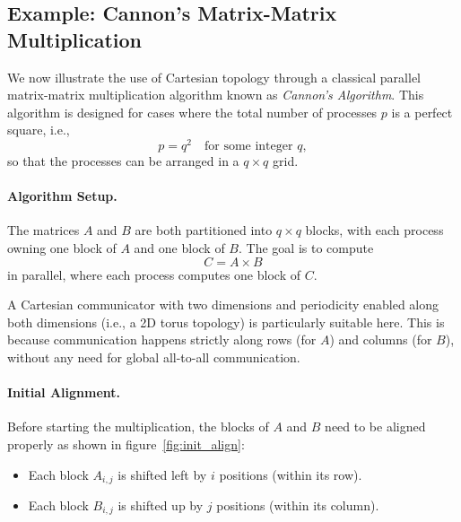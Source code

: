 \documentclass[12pt]{book}
\begin{document}
\subsection{Example: Cannon's Matrix-Matrix Multiplication}

We now illustrate the use of Cartesian topology through a classical parallel matrix-matrix multiplication algorithm known as \emph{Cannon's Algorithm}. This algorithm is designed for cases where the total number of processes $p$ is a perfect square, i.e.,
\[
p = q^2 \quad \text{for some integer } q,
\]
so that the processes can be arranged in a $q \times q$ grid.  

\paragraph{Algorithm Setup.}  
The matrices $A$ and $B$ are both partitioned into $q \times q$ blocks, with each process owning one block of $A$ and one block of $B$. The goal is to compute
\[
C = A \times B
\]
in parallel, where each process computes one block of $C$.

A Cartesian communicator with two dimensions and periodicity enabled along both dimensions (i.e., a 2D torus topology) is particularly suitable here. This is because communication happens strictly along rows (for $A$) and columns (for $B$), without any need for global all-to-all communication.

\paragraph{Initial Alignment.}  
Before starting the multiplication, the blocks of $A$ and $B$ need to be aligned properly as shown in figure~\ref{fig:init_align}:
\begin{itemize}
    \item Each block $A_{i,j}$ is shifted left by $i$ positions (within its row).
    \item Each block $B_{i,j}$ is shifted up by $j$ positions (within its column).
\end{itemize}
\end{document}
